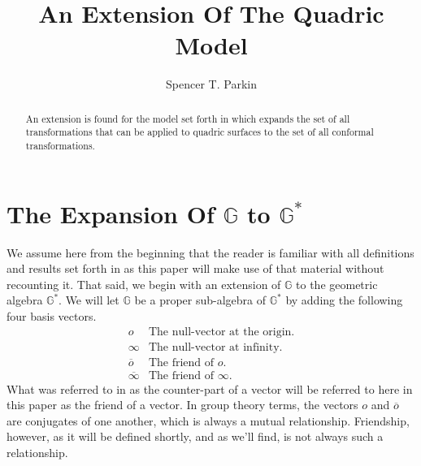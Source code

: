 \documentclass{birkjour}
\theoremstyle{definition}
\theoremstyle{remark}
\numberwithin{equation}{section}
\newcommand{\G}{\mathbb{G}}
\newcommand{\nvao}{o}
\newcommand{\nvai}{\infty}
\newcommand{\nvaob}{\overline{o}}
\newcommand{\nvaib}{\overline{\infty}}
\begin{document}
\title{An Extension Of The Quadric Model}

\author{Spencer T. Parkin}
\address{%
2113 S. Claremont Dr.\\
Bountiful, Utah  84010\\
USA}





\begin{abstract}
An extension is found for the model set forth in \cite{Parkin12}
which expands the set of all transformations that can be applied
to quadric surfaces to the set of all conformal transformations.
\end{abstract}

\maketitle

\section{The Expansion Of $\G$ to $\G^*$}

We assume here from the beginning that the reader is familiar with
all definitions and results set forth in \cite{Parkin12} as this paper
will make use of that material without recounting it.
That said, we begin with an extension of $\G$ to the geometric
algebra $\G^*$.  We will let $\G$ be a proper sub-algebra of $\G^*$
by adding the following four basis vectors.
\begin{equation}\label{equ_null_basis_vecs}
\begin{array}{ll}
\nvao & \mbox{The null-vector at the origin.} \\
\nvai & \mbox{The null-vector at infinity.} \\
\nvaob & \mbox{The friend of $\nvao$.} \\
\nvaib & \mbox{The friend of $\nvai$.}
\end{array}
\end{equation}
What was referred to in \cite{Parkin12} as the counter-part of a vector will be referred
to here in this paper as the friend of a vector.  In group theory terms, the vectors
$\nvao$ and $\nvaob$ are conjugates of one another, which is always a mutual
relationship.  Friendship, however, as it will be defined shortly, and as we'll find,
is not always such a relationship.
\end{document}
